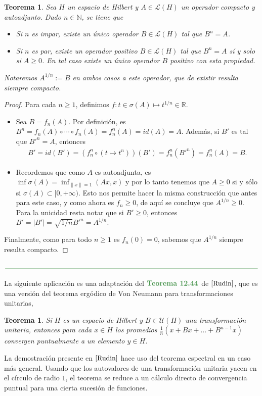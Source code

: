 \documentclass[11pt]{report}
\theoremstyle{colored}
\newtheorem{theorem}{Teorema}[section]
\newtheorem*{theorem*}{Teorema}
\newcommand{\N}{\mathbb{N}}
\newcommand{\R}{\mathbb{R}}
\newcommand{\paint}[1]{\color{color}{#1}}
\newcommand{\tpaint}[1]{\paint{\textbf{#1}}}
\newcommand{\paintline}{\begin{center}
$\paint{
\rule{400pt}{0.5pt}
}$
\vspace{10pt}
\end{center}}
\begin{document}
\begin{theorem}  Sea $H$ un espacio de Hilbert y $A \in \mathscr{L}(H)$ un operador compacto y autoadjunto. Dado $n \in \N$, se tiene que 
\begin{itemize}
\item[(i)] Si $n$ es impar, existe un único operador $B \in \mathscr{L}(H)$ tal que $B^n = A$.
\item[(ii)] Si $n$ es par, existe un operador positivo $B \in \mathscr{L}(H)$ tal que $B^n = A$ sí y solo si $A \geq 0$. En tal caso existe un único operador $B$ positivo con esta propiedad.
\end{itemize}
Notaremos $A^{1/n} := B$ en ambos casos a este operador, que de existir resulta siempre compacto.
\end{theorem}
\begin{proof} Para cada $n \geq 1$, definimos $f :t \in \sigma(A) \mapsto t^{1/n} \in \R$.
\begin{itemize}[listparindent = \parindent] 
\item[(i)] Sea $B = f_n(A)$. Por definición, es $B^n = f_n(A) \circ \cdots \circ f_n(A) = f_n^n(A) = id(A) = A$. Además, si $B'$ es tal que $B'^n = A$, entonces
\begin{align*}
B' = id(B') = (f_n^n \circ (t \mapsto t^n))(B') = f_n^n(B'^n) = f_n^n(A) = B.
\end{align*}
\item[(ii)] Recordemos que como $A$ es autoadjunta, es $\inf \sigma(A) = \inf_{\|x\| = 1} (Ax,x)$ y por lo tanto tenemos que $A \geq 0$ si y sólo si $\sigma(A) \subset [0,+\infty)$. 
Esto nos permite hacer la misma construcción que antes para este caso, y como ahora es $f_n \geq 0$, de aquí se concluye que $A^{1/n} \geq 0$. Para la unicidad resta notar que si $B' \geq 0$, entonces $B' = |B'| = \sqrt{1/n}{B'^n} = A^{1/n}.$
\end{itemize}

Finalmente, como para todo $n \geq 1$ es $f_n(0) = 0$, sabemos que $A^{1/n}$ siempre resulta compacto.
\end{proof}

\paintline

La siguiente aplicación es una adaptación del $\tpaint{Teorema 12.44}$ de $\cite{Rudin}$, que es una versión del teorema ergódico de Von Neumann para transformaciones unitarias,

\begin{tcolorbox}
\begin{theorem*} Si $H$ es un espacio de Hilbert y $B \in \mathscr{U}(H)$ una transformación unitaria, entonces para cada $x \in H$ los \textit{promedios} $\frac{1}{n}(x + Bx + \dots + B^{n-1}x)$ convergen puntualmente a un elemento $y \in H$.
\end{theorem*}
\end{tcolorbox}
La demostración presente en $\cite{Rudin}$ hace uso del teorema espectral en un caso más general. Usando que los autovalores de una transformación unitaria yacen en el círculo de radio $1$, el teorema se reduce a un cálculo directo de convergencia puntual para una cierta sucesión de funciones.
\end{document}
